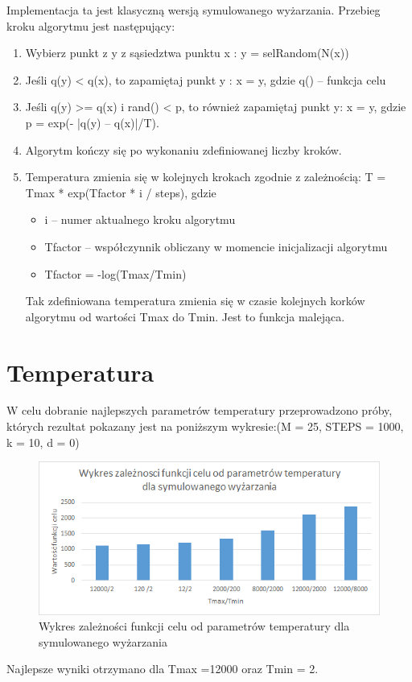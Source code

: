 \documentclass[a4paper]{article}
\begin{document}
Implementacja ta jest klasyczną wersją symulowanego wyżarzania. Przebieg kroku algorytmu jest następujący:
\begin{enumerate}
\item Wybierz punkt z y z sąsiedztwa punktu x : y = selRandom(N(x))
\item Jeśli q(y) < q(x), to zapamiętaj punkt y : x = y, gdzie q() – funkcja celu
\item Jeśli q(y) >= q(x) i rand() < p, to również zapamiętaj punkt y: x = y, gdzie p = exp(- |q(y) – q(x)|/T).
\item Algorytm kończy się po wykonaniu zdefiniowanej liczby kroków.
\item Temperatura zmienia się w kolejnych krokach zgodnie z zależnością:
T = Tmax * exp(Tfactor * i / steps), gdzie
\begin{itemize}
\item  i – numer aktualnego kroku algorytmu
\item Tfactor – współczynnik obliczany w momencie inicjalizacji algorytmu
\item Tfactor = -log(Tmax/Tmin)
\end{itemize}
Tak zdefiniowana temperatura zmienia się w czasie kolejnych korków algorytmu od wartości Tmax do Tmin. Jest to funkcja malejąca.
\end{enumerate}

\section{Temperatura}

W celu dobranie najlepszych parametrów temperatury przeprowadzono próby, których rezultat pokazany jest na poniższym wykresie:(M = 25, STEPS = 1000, k = 10, d = 0)
\begin{figure}[h]
\centering
\includegraphics[width=12cm]{temp}
\caption{Wykres zależności funkcji celu od parametrów temperatury dla symulowanego wyżarzania}
\end{figure}\newline
Najlepsze wyniki otrzymano dla Tmax =12000 oraz Tmin = 2.
\end{document}
